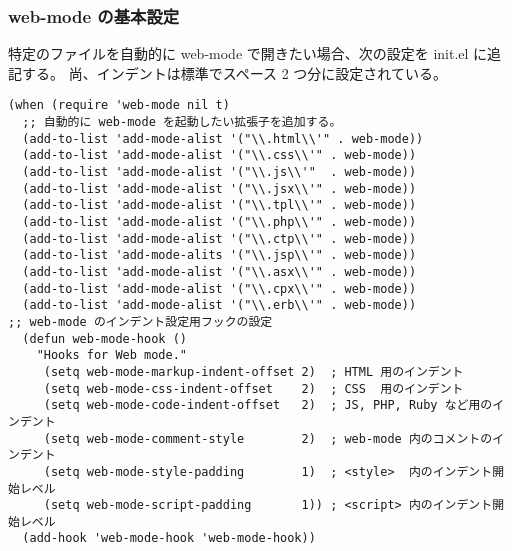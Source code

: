 \subsubsection{web-mode の基本設定}
特定のファイルを自動的に web-mode で開きたい場合、次の設定を init.el に追記する。
尚、インデントは標準でスペース 2 つ分に設定されている。
\begin{mdframed}[roundcorner=0.50zw,leftmargin=3.00zw,rightmargin=3.00zw,skipabove=0.40zw,skipbelow=0.40zw,innertopmargin=4.00pt,innerbottommargin=4.00pt,innerleftmargin=5.00pt,innerrightmargin=5.00pt,linecolor=gray!020,linewidth=0.50pt,backgroundcolor=gray!20]
\begin{verbatim}
(when (require 'web-mode nil t)
  ;; 自動的に web-mode を起動したい拡張子を追加する。
  (add-to-list 'add-mode-alist '("\\.html\\'" . web-mode))
  (add-to-list 'add-mode-alist '("\\.css\\'" . web-mode))
  (add-to-list 'add-mode-alist '("\\.js\\'"  . web-mode))
  (add-to-list 'add-mode-alist '("\\.jsx\\'" . web-mode))
  (add-to-list 'add-mode-alist '("\\.tpl\\'" . web-mode))
  (add-to-list 'add-mode-alist '("\\.php\\'" . web-mode))
  (add-to-list 'add-mode-alist '("\\.ctp\\'" . web-mode))
  (add-to-list 'add-mode-alits '("\\.jsp\\'" . web-mode))
  (add-to-list 'add-mode-alist '("\\.asx\\'" . web-mode))
  (add-to-list 'add-mode-alist '("\\.cpx\\'" . web-mode))
  (add-to-list 'add-mode-alist '("\\.erb\\'" . web-mode))
;; web-mode のインデント設定用フックの設定
  (defun web-mode-hook ()
    "Hooks for Web mode."
     (setq web-mode-markup-indent-offset 2)  ; HTML 用のインデント
     (setq web-mode-css-indent-offset    2)  ; CSS  用のインデント
     (setq web-mode-code-indent-offset   2)  ; JS, PHP, Ruby など用のインデント
     (setq web-mode-comment-style        2)  ; web-mode 内のコメントのインデント
     (setq web-mode-style-padding        1)  ; <style>  内のインデント開始レベル
     (setq web-mode-script-padding       1)) ; <script> 内のインデント開始レベル
  (add-hook 'web-mode-hook 'web-mode-hook))
\end{verbatim}
\end{mdframed}

